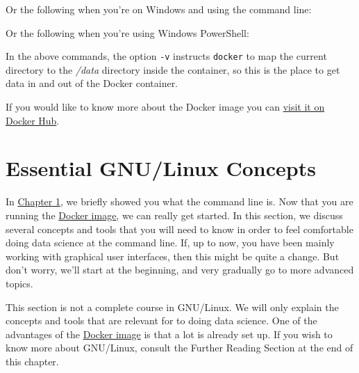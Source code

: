 \documentclass[
]{book}
\newenvironment{Shaded}{\begin{snugshade}}{\end{snugshade}}
\newcommand{\ExtensionTok}[1]{#1}
\newcommand{\NormalTok}[1]{#1}
\newcommand{\VariableTok}[1]{\textcolor[rgb]{0.00,0.00,0.00}{#1}}
\theoremstyle{definition}
\theoremstyle{definition}
\theoremstyle{definition}
\theoremstyle{remark}
\begin{document}
Or the following when you're on Windows and using the command line:

\begin{Shaded}
\end{Shaded}

Or the following when you're using Windows PowerShell:

\begin{Shaded}
\end{Shaded}

In the above commands, the option \texttt{-v} instructs \texttt{docker} to map the current directory to the \emph{/data} directory inside the container, so this is the place to get data in and out of the Docker container.

\begin{rmdnote}
If you would like to know more about the Docker image you can \href{https://hub.docker.com/r/datascienceworkshops/data-science-at-the-command-line/}{visit it on Docker Hub}.
\end{rmdnote}

\hypertarget{essential-gnulinux-concepts}{%
\section{Essential GNU/Linux Concepts}\label{essential-gnulinux-concepts}}

In \protect\hyperlink{chapter-1-introduction}{Chapter 1}, we briefly showed you what the command line is. Now that you are running the \protect\hyperlink{docker-image}{Docker image}, we can really get started. In this section, we discuss several concepts and tools that you will need to know in order to feel comfortable doing data science at the command line. If, up to now, you have been mainly working with graphical user interfaces, then this might be quite a change. But don't worry, we'll start at the beginning, and very gradually go to more advanced topics.

\begin{rmdnote}
This section is not a complete course in GNU/Linux. We will only explain the concepts and tools that are relevant for to doing data science. One of the advantages of the \protect\hyperlink{docker-image}{Docker image} is that a lot is already set up. If you wish to know more about GNU/Linux, consult the Further Reading Section at the end of this chapter.
\end{rmdnote}
\end{document}
